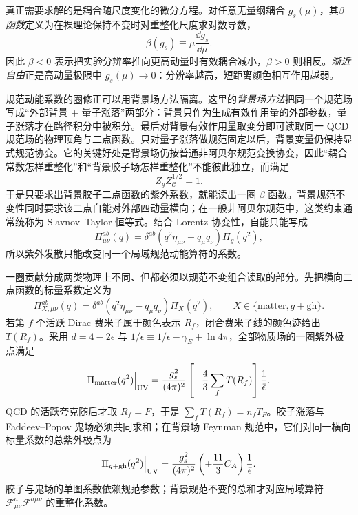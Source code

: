 真正需要求解的是耦合随尺度变化的微分方程。对任意无量纲耦合 $g_s(\mu)$，其\emph{$\beta$ 函数}定义为在裸理论保持不变时对重整化尺度求对数导数，
\begin{equation*}
 \beta(g_s)\equiv\mu\frac{\dd g_s}{\dd\mu}.
\end{equation*}
因此 $\beta<0$ 表示把实验分辨率推向更高动量时有效耦合减小，$\beta>0$ 则相反。\emph{渐近自由}正是高动量极限中 $g_s(\mu)\to0$：分辨率越高，短距离颜色相互作用越弱。

规范动能系数的圈修正可以用背景场方法隔离。这里的\emph{背景场方法}把同一个规范场写成“外部背景 + 量子涨落”两部分：背景只作为生成有效作用量的外部参数，量子涨落才在路径积分中被积分。最后对背景有效作用量取变分即可读取同一 QCD 规范场的物理顶角与二点函数。只对量子涨落做规范固定以后，背景变量仍保持显式规范协变。它的关键好处是背景场仍按普通非阿贝尔规范变换协变，因此“耦合常数怎样重整化”和“背景胶子场怎样重整化”不能彼此独立，而满足
\begin{equation}
 {Z_g Z_{\mathscr C}^{1/2}=1.}
 \label{eq:qcd-background-field-Zrelation-dp10}
\end{equation}
于是只要求出背景胶子二点函数的紫外系数，就能读出一圈 $\beta$ 函数。背景规范不变性同时要求该二点自能对外部四动量横向；在一般非阿贝尔规范中，这类约束通常统称为 Slavnov--Taylor 恒等式。结合 Lorentz 协变性，自能只能写成
\begin{equation*}
 \Pi_{\mu\nu}^{ab}(q)
 =\delta^{ab}(q^2\eta_{\mu\nu}-q_\mu q_\nu)\Pi_g(q^2),
\end{equation*}
所以紫外发散只能改变同一个局域规范动能算符的系数。

一圈贡献分成两类物理上不同、但都必须以规范不变组合读取的部分。先把横向二点函数的标量系数定义为
\begin{equation*}
 \Pi_{X,\mu\nu}^{ab}(q)
 =\delta^{ab}(q^2\eta_{\mu\nu}-q_\mu q_\nu)\Pi_X(q^2),
 \qquad X\in\{\mathrm{matter},g+\mathrm{gh}\}.
\end{equation*}
若第 $f$ 个活跃 Dirac 费米子属于颜色表示 $R_f$，闭合费米子线的颜色迹给出 $T(R_f)$。采用 $d=4-2\epsilon$ 与 $1/\bar\epsilon\equiv1/\epsilon-\gamma_E+\ln4\pi$，全部物质场的一圈紫外极点满足
\begin{equation}
 {
 \Pi_{\rm matter}(q^2)\Big|_{\rm UV}
 =\frac{g_s^2}{(4\pi)^2}
 \left[-\frac{4}{3}\sum_fT(R_f)\right]
 \frac1{\bar\epsilon}.}
 \label{eq:qcd-quark-loop-uv-coefficient-dp10}
\end{equation}
QCD 的活跃夸克随后才取 $R_f=F$，于是 $\sum_fT(R_f)=n_fT_F$。胶子涨落与 Faddeev--Popov 鬼场必须共同求和；在背景场 Feynman 规范中，它们对同一横向标量系数的总紫外极点为
\begin{equation}
 {
 \Pi_{g+\rm gh}(q^2)\Big|_{\rm UV}
 =\frac{g_s^2}{(4\pi)^2}
 \left(+\frac{11}{3}C_A\right)
 \frac1{\bar\epsilon}.}
 \label{eq:qcd-glue-ghost-uv-coefficient-dp10}
\end{equation}
胶子与鬼场的单图系数依赖规范参数；背景规范不变的总和才对应局域算符 $\mathcal F_{\mu\nu}^a\mathcal F^{a\mu\nu}$ 的重整化系数。

